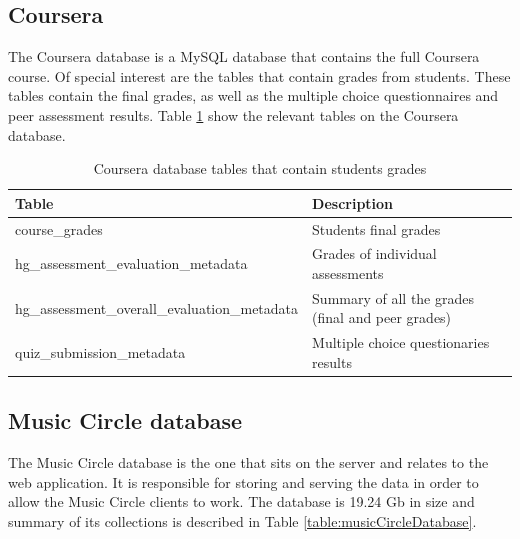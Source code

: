 \documentclass[11pt, oneside]{article}   	%
\begin{document}
\subsection{Coursera}
The Coursera database is a MySQL database that contains the full Coursera course. Of special interest are the tables that contain grades from students. These tables contain the final grades, as well as the multiple choice questionnaires and peer assessment results. Table \ref{table:courseraDatabase} show the relevant tables on the Coursera database.
\begin{table}[h!]
	\centering
	\begin{tabularx}{\linewidth}{|X|X|}
		\hline
		 \textbf{Table} & \textbf{Description}\\ \hline
		 course\_grades & Students final grades \\ \hline
		 hg\_assessment\_evaluation\_metadata & Grades of individual assessments \\ \hline
		 hg\_assessment\_overall\_evaluation\_metadata & Summary of all the grades (final and peer grades) \\ \hline
		 quiz\_submission\_metadata & Multiple choice questionaries results \\ \hline
	\end{tabularx}
	\caption{Coursera database tables that contain students grades}
	\label{table:courseraDatabase}
\end{table}
\clearpage
\subsection{Music Circle database}
The Music Circle database is the one that sits on the server and relates to the web application. It is responsible for storing and serving the data in order to allow the Music Circle clients to work. The database is 19.24 Gb in size and summary of its collections is described in Table \ref{table:musicCircleDatabase}.
\end{document}
